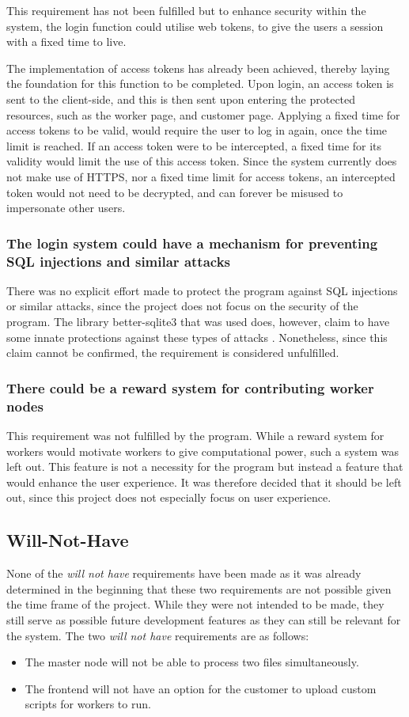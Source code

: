 This requirement has not been fulfilled but to enhance security within the system, the login function could utilise web tokens, to give the users a session with a fixed time to live.

The implementation of access tokens has already been achieved, thereby laying the foundation for this function to be completed. Upon login, an access token is sent to the client-side, and this is then sent upon entering the protected resources, such as the worker page, and customer page.
Applying a fixed time for access tokens to be valid, would require the user to log in again, once the time limit is reached. If an access token were to be intercepted, a fixed time for its validity would limit the use of this access token.
Since the system currently does not make use of HTTPS, nor a fixed time limit for access tokens, an intercepted token would not need to be decrypted, and can forever be misused to impersonate other users.

\subsubsection{The login system could have a mechanism for preventing SQL injections and similar attacks}
There was no explicit effort made to protect the program against SQL injections or similar attacks, since the project does not focus on the security of the program. The library better-sqlite3 that was used does, however, claim to have some innate protections against these types of attacks \cite{SQLInjectionsBettersqlite3}. Nonetheless, since this claim cannot be confirmed, the requirement is considered unfulfilled.

\subsubsection{There could be a reward system for contributing worker nodes}
This requirement was not fulfilled by the program. While a reward system for workers would motivate workers to give computational power, such a system was left out. This feature is not a necessity for the program but instead a feature that would enhance the user experience. It was therefore decided that it should be left out, since this project does not especially focus on user experience.


\subsection{Will-Not-Have}
None of the \emph{will not have} requirements have been made as it was already determined in the beginning that these two requirements are not possible given the time frame of the project. While they were not intended to be made, they still serve as possible future development features as they can still be relevant for the system. The two \emph{will not have} requirements are as follows:
\begin{itemize}
      \item The master node will not be able to process two files simultaneously.
      \item The frontend will not have an option for the customer to upload custom scripts for workers to run.
  \end{itemize}
